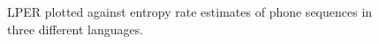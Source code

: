 \begin{figure}[t!]
  
  \vspace*{-0.5cm}
  \caption{LPER plotted against entropy rate estimates of phone sequences in three different languages.}
\label{fig:listPER}
\end{figure}

